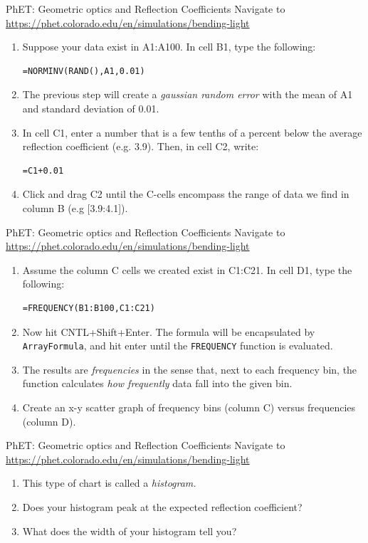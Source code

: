 \documentclass{beamer}
\begin{document}
\begin{frame}[fragile]{PhET: Geometric optics and Reflection Coefficients}
Navigate to \url{https://phet.colorado.edu/en/simulations/bending-light} \\
\begin{enumerate}
\item Suppose your data exist in A1:A100.  In cell B1, type the following:
\begin{verbatim}
=NORMINV(RAND(),A1,0.01)
\end{verbatim}
\item The previous step will create a \textit{gaussian random error} with the mean of A1 and standard deviation of 0.01.
\item In cell C1, enter a number that is a few tenths of a percent below the average reflection coefficient (e.g. 3.9).  Then, in cell C2, write:
\begin{verbatim}
=C1+0.01
\end{verbatim}
\item Click and drag C2 until the C-cells encompass the range of data we find in column B (e.g [3.9:4.1]).
\end{enumerate}
\end{frame}

\begin{frame}[fragile]{PhET: Geometric optics and Reflection Coefficients}
Navigate to \url{https://phet.colorado.edu/en/simulations/bending-light} \\
\begin{enumerate}
\item Assume the column C cells we created exist in C1:C21.  In cell D1, type the following:
\begin{verbatim}
=FREQUENCY(B1:B100,C1:C21)
\end{verbatim}
\item Now hit CNTL+Shift+Enter.  The formula will be encapsulated by \verb+ArrayFormula+, and hit enter until the \verb+FREQUENCY+ function is evaluated.
\item The results are \textit{frequencies} in the sense that, next to each frequency bin, the function calculates \textit{how frequently} data fall into the given bin.
\item Create an x-y scatter graph of frequency bins (column C) versus frequencies (column D).
\end{enumerate}
\end{frame}

\begin{frame}[fragile]{PhET: Geometric optics and Reflection Coefficients}
Navigate to \url{https://phet.colorado.edu/en/simulations/bending-light} \\
\begin{enumerate}
\item This type of chart is called a \textit{histogram.}
\item Does your histogram peak at the expected reflection coefficient?
\item What does the width of your histogram tell you?
\end{enumerate}
\end{frame}
\end{document}
